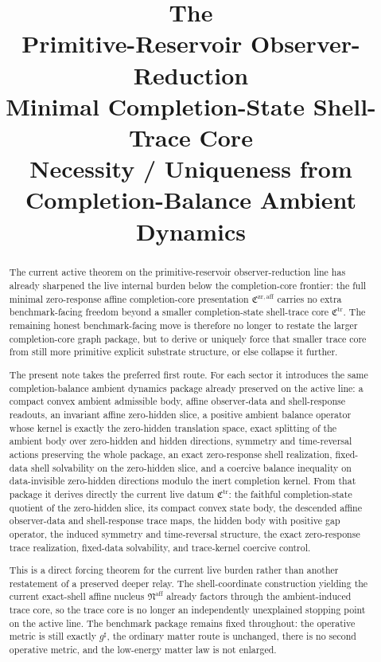 \documentclass[11pt]{article}
\title{\textbf{The \TheoryName{}}\\[0.4em]
\large Primitive-Reservoir Observer-Reduction\\
\large Minimal Completion-State Shell-Trace Core\\
\large Necessity / Uniqueness from Completion-Balance Ambient Dynamics}
\author{}
\date{}
\newcommand{\CompletedMetric}{g^{\sharp}}
\newcommand{\CompletionCore}{\mathfrak C^{\mathrm{zr,aff}}}
\newcommand{\TraceCore}{\mathfrak C^{\mathrm{tr}}}
\newcommand{\AffineNucleus}{\mathfrak N^{\mathrm{aff}}}
\begin{document}
\maketitle

\begin{abstract}
The current active theorem on the primitive-reservoir observer-reduction line has already sharpened the live internal burden below the completion-core frontier: the full minimal zero-response affine completion-core presentation \(\CompletionCore\) carries no extra benchmark-facing freedom beyond a smaller completion-state shell-trace core \(\TraceCore\). The remaining honest benchmark-facing move is therefore no longer to restate the larger completion-core graph package, but to derive or uniquely force that smaller trace core from still more primitive explicit substrate structure, or else collapse it further.

The present note takes the preferred first route. For each sector it introduces the same completion-balance ambient dynamics package already preserved on the active line: a compact convex ambient admissible body, affine observer-data and shell-response readouts, an invariant affine zero-hidden slice, a positive ambient balance operator whose kernel is exactly the zero-hidden translation space, exact splitting of the ambient body over zero-hidden and hidden directions, symmetry and time-reversal actions preserving the whole package, an exact zero-response shell realization, fixed-data shell solvability on the zero-hidden slice, and a coercive balance inequality on data-invisible zero-hidden directions modulo the inert completion kernel. From that package it derives directly the current live datum \(\TraceCore\): the faithful completion-state quotient of the zero-hidden slice, its compact convex state body, the descended affine observer-data and shell-response trace maps, the hidden body with positive gap operator, the induced symmetry and time-reversal structure, the exact zero-response trace realization, fixed-data solvability, and trace-kernel coercive control.

This is a direct forcing theorem for the current live burden rather than another restatement of a preserved deeper relay. The shell-coordinate construction yielding the current exact-shell affine nucleus \(\AffineNucleus\) already factors through the ambient-induced trace core, so the trace core is no longer an independently unexplained stopping point on the active line. The benchmark package remains fixed throughout: the operative metric is still exactly \(\CompletedMetric\), the ordinary matter route is unchanged, there is no second operative metric, and the low-energy matter law is not enlarged.
\end{abstract}
\end{document}
